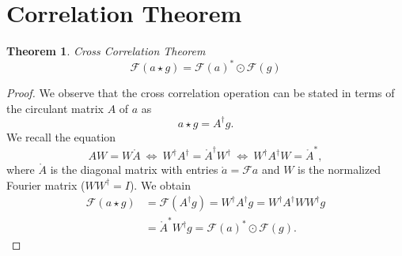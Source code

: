 \documentclass[11pt]{scrartcl}
\newcommand{\FT}{\mathcal{F}}
\newtheorem*{theorem}{Theorem}
\begin{document}
\section{Correlation Theorem}

\begin{theorem} Cross Correlation Theorem
\[
 \FT\left(a\star g\right) = \FT(a)^*\odot\FT(g)
\]
\end{theorem}
\begin{proof}
We observe that the cross correlation operation can be stated in terms of the circulant matrix $A$ of $a$ as
\[
 a\star g = A^\dagger g.
\]
We recall the equation 
\[
 AW = W\mathring A {\ }\Leftrightarrow{\ } W^\dagger A^\dagger = \mathring{A}^\dagger W^\dagger {\ }\Leftrightarrow{\ } W^\dagger A^\dagger W = \mathring{A}^*,
\]
where $\mathring A$ is the diagonal matrix with entries $\mathring{a} = \FT a$ and $W$ is the normalized Fourier matrix ($WW^\dagger=I$).
We obtain
\begin{align*}
\FT\left(a\star g\right) &= \FT\left(A^\dagger g\right) = W^\dagger A^\dagger g = W^\dagger A^\dagger W W^\dagger g\\
			 &= \mathring{A}^* W^\dagger g = \FT(a)^*\odot\FT(g).
\end{align*}
\end{proof}

\newpage
\appendix

\end{document}
